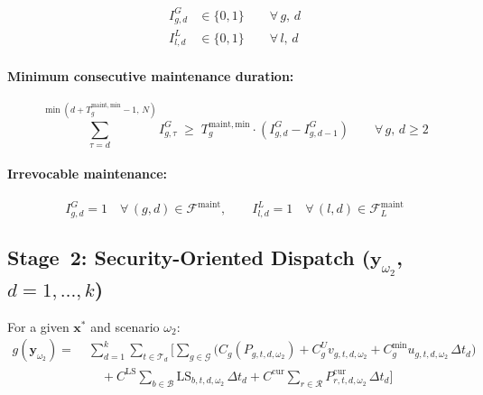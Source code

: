 \documentclass[11pt]{article}
\newcommand{\LS}{\mathrm{LS}}
\begin{document}
\begin{align}
  I^{G}_{g,d} &\in \{0, 1\}
    \qquad \forall\, g,\, d \label{eq:s1-maint-gen}\\
  I^{L}_{l,d} &\in \{0, 1\}
    \qquad \forall\, l,\, d \label{eq:s1-maint-line}
\end{align}

\paragraph{Minimum consecutive maintenance duration:}
\begin{equation}\label{eq:s1-maint-min}
  \sum_{\tau=d}^{\min(d+T^{\mathrm{maint,min}}_g-1,\,N)}
  I^{G}_{g,\tau}
  \;\geq\;
  T^{\mathrm{maint,min}}_g
  \cdot (I^{G}_{g,d} - I^{G}_{g,d-1})
  \qquad \forall\, g,\, d \geq 2
\end{equation}

\paragraph{Irrevocable maintenance:}
\begin{equation}\label{eq:s1-maint-fix}
  I^{G}_{g,d} = 1 \quad \forall\, (g,d) \in \mathcal{F}^{\mathrm{maint}},
  \qquad
  I^{L}_{l,d} = 1 \quad \forall\, (l,d) \in \mathcal{F}^{\mathrm{maint}}_L
\end{equation}

\subsection{Stage~2: Security-Oriented Dispatch
  ($\mathbf{y}_{\omega_2}$, $d = 1,\ldots,k$)}
\label{sec:s2-obj}

For a given $\mathbf{x}^*$ and scenario $\omega_2$:
\begin{equation}\label{eq:Q2-def}
\boxed{
\begin{aligned}
  g(\mathbf{y}_{\omega_2}) =\;
  & \sum_{d=1}^{k}\sum_{t \in \mathcal{T}_d}\Biggl[
    \sum_{g \in \mathcal{G}}
    \bigl(C_g(P_{g,t,d,\omega_2}) + C^{U}_g v_{g,t,d,\omega_2}
    + C^{\min}_g u_{g,t,d,\omega_2}\,\Delta t_d\bigr) \\
  &\quad
    + C^{\mathrm{LS}} \sum_{b \in \mathcal{B}}
      \LS_{b,t,d,\omega_2}\,\Delta t_d
    + C^{\mathrm{cur}} \sum_{r \in \mathcal{R}}
      P^{\mathrm{cur}}_{r,t,d,\omega_2}\,\Delta t_d
  \Biggr]
\end{aligned}
}
\end{equation}
\end{document}
